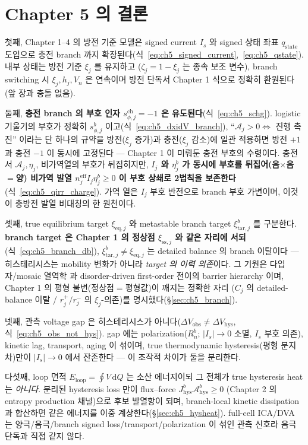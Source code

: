 \documentclass[11pt,a4paper]{article}
\newcommand{\dd}{\mathrm{d}}
\newcommand{\eff}{\mathrm{eff}}
\newcommand{\eq}{\mathrm{eq}}
\newcommand{\sstat}{\mathrm{ss}}
\newcommand{\chg}{\mathrm{ch}}
\newcommand{\hys}{\mathrm{hys}}
\newcommand{\obs}{\mathrm{obs}}
\newcommand{\tar}{\mathrm{tar}}
\newcommand{\stt}{\mathrm{state}}
\begin{document}
\section{Chapter 5 의 결론}\label{sec:ch5_concl}
첫째, Chapter 1--4 의 방전 기준 모델은 signed current $I_s$ 와 signed 상태 좌표 $q_\stt$ 도입으로 충전 branch 까지
확장된다(식~\eqref{eq:ch5_signed_current},~\eqref{eq:ch5_qstate}). 내부 상태는 방전 기준 $\xi_j$ 를 유지하고
($\zeta_j=1-\xi_j$ 는 종속 보조 변수), branch switching 시 $\xi_j,h_j,V_n$ 은 연속이며 방전 단독서 Chapter 1 식으로
정확히 환원된다(앞 장과 충돌 없음).

둘째, \textbf{충전 branch 의 부호 인자 $s_{\phi,j}^\chg=-1$ 은 유도된다}(식~\eqref{eq:ch5_schg}). logistic 기울기의
부호가 정확히 $s_{\phi,j}^b$ 이고(식~\eqref{eq:ch5_dxidV_branch}), ``$\mathcal A_j>0\Leftrightarrow$ 진행 촉진''
이라는 단 하나의 규약을 방전($\xi_j$ 증가)과 충전($\xi_j$ 감소)에 일관 적용하면 방전 $+1$ 과 충전 $-1$ 이 동시에
고정된다 — Chapter 1 이 미뤄둔 충전 부호의 수령이다. 충전서 $\mathcal A_j,\eta_j$, 비가역열의 부호가 뒤집히지만,
\textbf{$I_j$ 와 $\eta_j^b$ 가 동시에 부호를 뒤집어(음$\times$음$=$양) 비가역 발열 $n_j^{\eff}I_j\eta_j^b\ge0$ 이
부호 상쇄로 2법칙을 보존한다}(식~\eqref{eq:ch5_qirr_charge}). 가역 열은 $I_j$ 부호 반전으로 branch 부호 가변이며,
이것이 충방전 발열 비대칭의 한 원천이다.

셋째, true equilibrium target $\xi_{\eq,j}$ 와 metastable branch target $\xi_{\tar,j}^b$ 를 구분한다.
\textbf{branch target 은 Chapter 1 의 정상점 $\xi_{\sstat,j}$ 와 같은 자리에 서되}(식~\eqref{eq:ch5_branch_db}),
$\xi_{\tar,j}^b\ne\xi_{\eq,j}$ 는 detailed balance 의 branch 이탈이다 — 히스테리시스는 mobility 변화가 아니라
\emph{target 의 이력 의존}이다. 그 기원은 다입자/mosaic 열역학 \cite{dreyer2010} 과 disorder-driven first-order
전이의 barrier hierarchy \cite{sethna1993} 이며, Chapter 1 의 평형 불변(정상점$=$평형값)이 깨지는 정확한 자리
($C_j$ 의 detailed-balance 이탈 / $r_j^+/r_j^-$ 의 $\xi_j$-의존)를 명시했다(\S\ref{sec:ch5_branch}).

넷째, 관측 voltage gap 은 히스테리시스가 아니다(\textbf{$\Delta V_\obs\ne\Delta V_\hys$},
식~\eqref{eq:ch5_obs_not_hys}). gap 에는 polarization($R_n^b$; $|I_s|\to0$ 소멸, $I_s$ 부호 의존), kinetic lag,
transport, aging 이 섞이며, true thermodynamic hysteresis(평형 분지 차)만이 $|I_s|\to0$ 에서 잔존한다 — 이 조작적
차이가 둘을 분리한다.

다섯째, loop 면적 $E_{\mathrm{loop}}=\oint V\,\dd Q$ 는 소산 에너지이되 그 전체가 true hysteresis heat 는
\emph{아니다}\cite{dreyer2010}. 분리된 hysteresis loss 만이 flux--force $J_\hys^b\mathcal A_\hys^b\ge0$ (Chapter 2
의 entropy production 채널)으로 후보 발열항이 되며, branch-local kinetic dissipation 과 합산하면 같은 에너지를
이중 계상한다(\S\ref{sec:ch5_hysheat}). full-cell ICA/DVA 는 양극/음극/branch signed loss/transport/polarization
이 섞인 관측 신호라 음극 단독과 직접 같지 않다.
\end{document}
